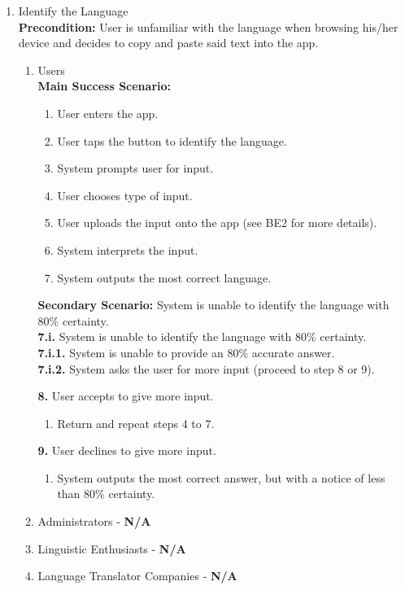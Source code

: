 \begin{enumerate}[{\bf BE1:}]
	\item Identify the Language \\
		\textbf{Precondition:} User is unfamiliar with the language when browsing his/her device and decides to copy and paste said text into the app.
		\begin{enumerate}[{\bf VP1:}]
			\item Users \\
				\textbf{Main Success Scenario:}
					\begin{enumerate}[{\bf 1.}]
						\item User enters the app.
						\item User taps the button to identify the language.
							\item System prompts user for input.
							\item User chooses type of input.
							\item User uploads the input onto the app (see BE2 for more details).
							\item System interprets the input.
							\item System outputs the most correct language.
					\end{enumerate}
				
					\textbf{Secondary Scenario:} System is unable to identify the language with 80\% certainty. \\
					\textbf{7.i.} System is unable to identify the language with 80\% certainty.\\
					\textbf{7.i.1.} System is unable to provide an 80\% accurate answer. \\
					\textbf{7.i.2.} System asks the user for more input (proceed to step 8 or 9).
					
					\textbf{8.} User accepts to give more input.
					\begin{enumerate}[{\bf 8.1.}]
						\item Return and repeat steps 4 to 7.
					\end{enumerate}
					\textbf{9.} User declines to give more input.
					\begin{enumerate}[{\bf 9.1.}]
						\item System outputs the most correct answer, but with a notice of less than 80\% certainty.
					\end{enumerate}
					
			\item Administrators - \textbf{N/A}
			\item Linguistic Enthusiasts - \textbf{N/A}
			\item Language Translator Companies - \textbf{N/A}
		\end{enumerate}


\end{enumerate}
